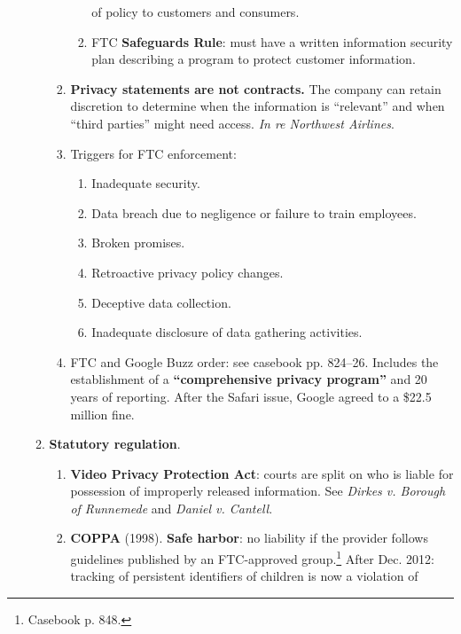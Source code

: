 \begin{enumerate}
\begin{enumerate}
\begin{enumerate}
\begin{enumerate}
                of policy to customers and consumers.
                \item FTC \textbf{Safeguards Rule}: must have a written 
                information security plan describing a program to protect 
                customer information.
            \end{enumerate}
            \item \textbf{Privacy statements are not contracts.} The company 
            can retain discretion to determine when the information is 
            ``relevant'' and when ``third parties'' might need access. 
            \emph{In re Northwest Airlines}.
            \item Triggers for FTC enforcement:
            \begin{enumerate}
                \item Inadequate security.
                \item Data breach due to negligence or failure to train 
                employees.
                \item Broken promises.
                \item Retroactive privacy policy changes.
                \item Deceptive data collection.
                \item Inadequate disclosure of data gathering activities.
            \end{enumerate}
            \item FTC and Google Buzz order: see casebook pp. 824--26.  
            Includes the establishment of a \textbf{``comprehensive privacy 
            program''} and 20 years of reporting. After the Safari issue, 
            Google agreed to a \$22.5 million fine.
        \end{enumerate}
        \item \textbf{Statutory regulation}.
        \begin{enumerate}
            \item \textbf{Video Privacy Protection Act}: courts are split on 
            who is liable for possession of improperly released information. 
            See \emph{Dirkes v. Borough of Runnemede} and \emph{Daniel v. 
            Cantell}.
            \item \textbf{COPPA} (1998). \textbf{Safe harbor}: no liability if 
            the provider follows guidelines published by an FTC-approved 
            group.\footnote{Casebook p. 848.} After Dec. 2012: tracking of 
            persistent identifiers of children is now a violation of 

\end{enumerate}
\end{enumerate}
\end{enumerate}
